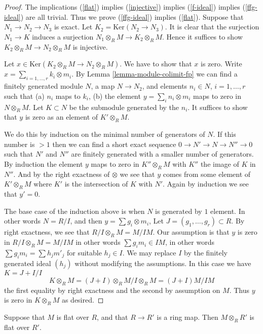 \begin{proof}
The implications (\ref{flat}) implies (\ref{injective})
implies (\ref{f-ideal}) implies (\ref{ffg-ideal}) are all
trivial. Thus we prove (\ref{ffg-ideal}) implies (\ref{flat}).
Suppose that $N_1 \to N_2 \to N_3$ is exact.
Let $K_2 = \text{Ker}(N_2 \to N_3)$. 
It is clear that the surjection $N_1 \to K$
induces a surjection $N_1 \otimes_R M \to K_2\otimes_R M$.
Hence it suffices to show $K_2\otimes_R M \to N_2\otimes_R M$
is injective.

\medskip\noindent
Let $x \in \text{Ker}(K_2\otimes_R M \to N_2\otimes_R M)$.
We have to show that $x$ is zero.
Write $x = \sum_{i=1,\ldots,r} k_i \otimes m_i$. By
Lemma \ref{lemma-module-colimit-fp}
we can find a finitely generated module $N$,
a map $N \to N_2$, and elements $n_i \in N$, $i=1,\ldots,r$ such that
(a) $n_i$ maps to $k_i$, (b) the element $y = \sum_i n_i \otimes m_i$
maps to zero in $N \otimes_R M$. Let $K \subset N$
be the submodule generated by the $n_i$. It suffices to show that
$y$ is zero as an element of $K' \otimes_R M$.

\medskip\noindent
We do this by induction on the minimal number of generators of
$N$. If this number is $>1$ then we can find a short exact
sequence
$0 \to N' \to N \to N''\to 0$
such that $N'$ and $N''$ are finitely generated with a smaller
number of generators. By induction the element $y$ maps
to zero in $K'' \otimes_R M$ with $K''$ the image of $K$
in $N''$. And by the right exactness of $\otimes$ we see
that $y$ comes from some element of $K' \otimes_R M$
where $K'$ is the intersection of $K$ with $N'$. Again
by induction we see that $y' = 0$.

\medskip\noindent
The base case of the induction above is when
$N$ is generated by $1$ element. In other words
$N = R/I$, and then $y = \sum g_i \otimes m_i$,
Let $J = (g_1,\ldots,g_r) \subset R$.
By right exactness, we see that $R/I \otimes_R M
= M/IM$. Our assumption is that $y$ is zero
in $R/I \otimes_R M = M/IM$ in other words
$\sum g_im_i \in IM$, in other words
$\sum g_im_i = \sum h_j m'_j$ for suitable
$h_j \in I$. We may replace $I$ by the finitely
generated ideal $(h_j)$ without modifying the assumptions.
In this case we have $K = J+I/I$
$$
K\otimes_R M
=
(J+I)\otimes_R M /I\otimes_R M
=
(J+I)M / IM
$$
the first equality by right exactness
and the second by assumption on $M$.
Thus $y$ is zero in $K\otimes_RM$ as desired.
\end{proof}

\begin{lemma}
\label{lemma-flat-base-change}
Suppose that $M$ is flat over $R$, and that $R \to R'$
is a ring map. Then $M\otimes_R R'$ is flat over $R'$.
\end{lemma}

